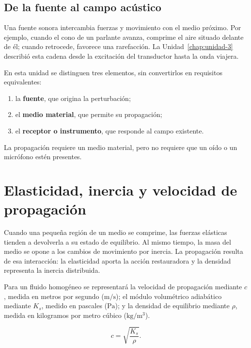 \subsection{De la fuente al campo acústico}
\label{sec:u4-generacion}

Una fuente sonora intercambia fuerzas y movimiento con el medio próximo. Por
ejemplo, cuando el cono de un parlante avanza, comprime el aire situado delante
de él; cuando retrocede, favorece una rarefacción. La Unidad~\ref{chap:unidad-3}
describió esta cadena desde la excitación del transductor hasta la onda
viajera.

En esta unidad se distinguen tres elementos, sin convertirlos en requisitos
equivalentes:

\begin{enumerate}
    \item la \textbf{fuente}, que origina la perturbación;
    \item el \textbf{medio material}, que permite su propagación;
    \item el \textbf{receptor o instrumento}, que responde al campo existente.
\end{enumerate}

La propagación requiere un medio material, pero no requiere que un oído o un
micrófono estén presentes.

\section{Elasticidad, inercia y velocidad de propagación}
\label{sec:u4-elasticidad-velocidad}

Cuando una pequeña región de un medio se comprime, las fuerzas elásticas
tienden a devolverla a su estado de equilibrio. Al mismo tiempo, la masa del
medio se opone a los cambios de movimiento por inercia. La propagación resulta
de esa interacción: la elasticidad aporta la acción restauradora y la densidad
representa la inercia distribuida.

Para un fluido homogéneo se representará la velocidad de propagación mediante
\(c\), medida en metros por segundo (\(\text{m}/\text{s}\)); el módulo
volumétrico adiabático mediante \(K_s\), medido en pascales (\(\text{Pa}\)); y
la densidad de equilibrio mediante \(\rho\), medida en kilogramos por metro
cúbico (\(\text{kg}/\text{m}^3\)). 

\begin{equation}
    c=\sqrt{\frac{K_s}{\rho}}.
    \label{eq:u4-velocidad-fluido}
\end{equation}

